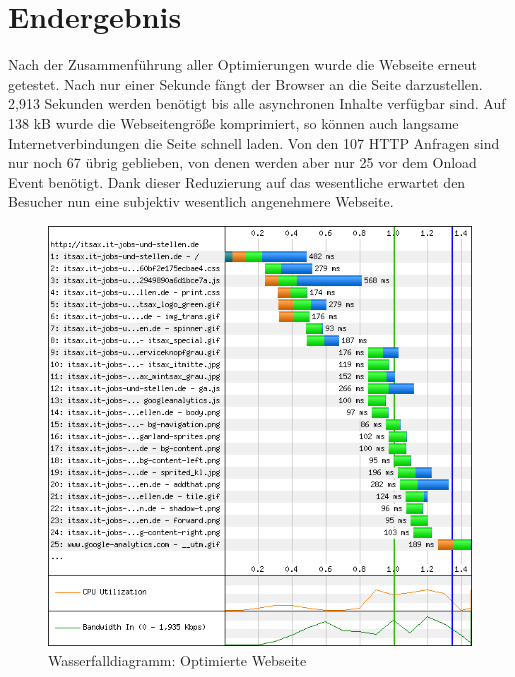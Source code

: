 \section{Endergebnis} 
Nach der Zusammenführung aller Optimierungen wurde die Webseite erneut getestet. Nach nur einer Sekunde fängt der Browser an die Seite darzustellen. 2,913 Sekunden werden benötigt bis alle asynchronen Inhalte verfügbar sind. Auf 138 kB wurde die Webseitengröße komprimiert, so können auch langsame Internetverbindungen die Seite schnell laden. Von den 107 HTTP Anfragen sind nur noch 67 übrig geblieben, von denen werden aber nur 25 vor dem Onload Event benötigt. Dank dieser Reduzierung auf das wesentliche erwartet den Besucher nun eine subjektiv wesentlich angenehmere Webseite. 
\begin{figure}[htbp]
  \centering
  \includegraphics[scale=0.5]{material/end_waterfall.png}
  \caption{Wasserfalldiagramm: Optimierte Webseite}
  \label{fig:endwaterfall}
\end{figure}
